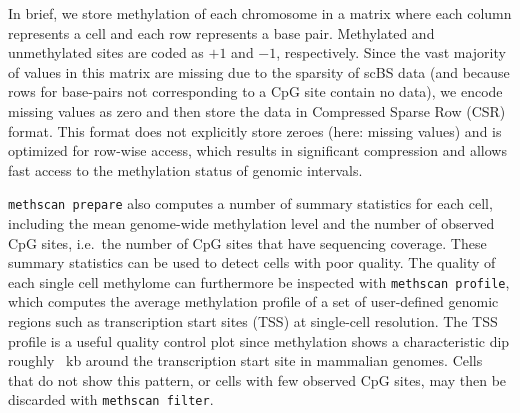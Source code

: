 \documentclass[twocolumn,10pt]{article}
\begin{document}
In brief, we store methylation of each chromosome in a matrix where each column represents a cell and each row represents a base pair.
Methylated and unmethylated sites are coded as $+1$ and $-1$, respectively.
Since the vast majority of values in this matrix are missing due to the sparsity of scBS data (and because rows for base-pairs not corresponding to a CpG site contain no data), we encode missing values as zero and then store the data in Compressed Sparse Row (CSR) format.
This format does not explicitly store zeroes (here: missing values) and is optimized for row-wise access, which results in significant compression and allows fast access to the methylation status of genomic intervals.

\texttt{methscan prepare} also computes a number of summary statistics for each cell, including the mean genome-wide methylation level and the number of observed CpG sites, i.e.\ the number of CpG sites that have sequencing coverage.
These summary statistics can be used to detect cells with poor quality.
The quality of each single cell methylome can furthermore be inspected with \texttt{methscan profile}, which computes the average methylation profile of a set of user-defined genomic regions such as transcription start sites (TSS) at single-cell resolution.
The TSS profile is a useful quality control plot since methylation shows a characteristic dip roughly ~kb around the transcription start site in mammalian genomes.
Cells that do not show this pattern, or cells with few observed CpG sites, may then be discarded with \texttt{methscan filter}.
\end{document}
